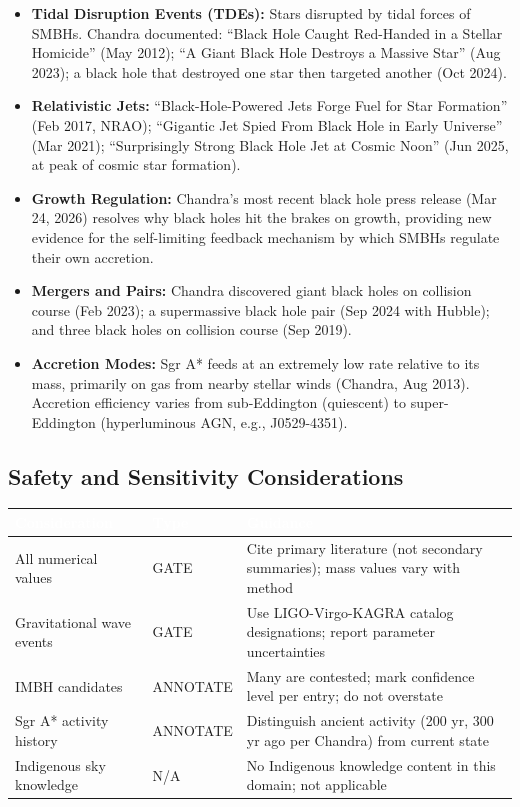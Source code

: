 \documentclass[11pt,letterpaper]{article}
\newcommand{\tableheader}[1]{\textbf{\sffamily\textcolor{white}{#1}}}
\begin{document}
\begin{itemize}[leftmargin=1.5em]
  \item \textbf{Tidal Disruption Events (TDEs):} Stars disrupted by tidal forces of SMBHs. Chandra documented: ``Black Hole Caught Red-Handed in a Stellar Homicide'' (May 2012); ``A Giant Black Hole Destroys a Massive Star'' (Aug 2023); a black hole that destroyed one star then targeted another (Oct 2024).
  \item \textbf{Relativistic Jets:} ``Black-Hole-Powered Jets Forge Fuel for Star Formation'' (Feb 2017, NRAO); ``Gigantic Jet Spied From Black Hole in Early Universe'' (Mar 2021); ``Surprisingly Strong Black Hole Jet at Cosmic Noon'' (Jun 2025, at peak of cosmic star formation).
  \item \textbf{Growth Regulation:} Chandra's most recent black hole press release (Mar 24, 2026) resolves why black holes hit the brakes on growth, providing new evidence for the self-limiting feedback mechanism by which SMBHs regulate their own accretion.
  \item \textbf{Mergers and Pairs:} Chandra discovered giant black holes on collision course (Feb 2023); a supermassive black hole pair (Sep 2024 with Hubble); and three black holes on collision course (Sep 2019).
  \item \textbf{Accretion Modes:} Sgr A* feeds at an extremely low rate relative to its mass, primarily on gas from nearby stellar winds (Chandra, Aug 2013). Accretion efficiency varies from sub-Eddington (quiescent) to super-Eddington (hyperluminous AGN, e.g., J0529-4351).
\end{itemize}

\subsection{Safety and Sensitivity Considerations}

\begin{center}
\begin{tabularx}{\textwidth}{L{4cm}L{3cm}X}
\toprule
{}
\tableheader{Consideration} & \tableheader{Type} & \tableheader{Guidance} \\
\midrule
All numerical values & GATE & Cite primary literature (not secondary summaries); mass values vary with method \\
Gravitational wave events & GATE & Use LIGO-Virgo-KAGRA catalog designations; report parameter uncertainties \\
IMBH candidates & ANNOTATE & Many are contested; mark confidence level per entry; do not overstate \\
Sgr A* activity history & ANNOTATE & Distinguish ancient activity (200 yr, 300 yr ago per Chandra) from current state \\
Indigenous sky knowledge & N/A & No Indigenous knowledge content in this domain; not applicable \\
\bottomrule
\end{tabularx}
\end{center}
\end{document}
